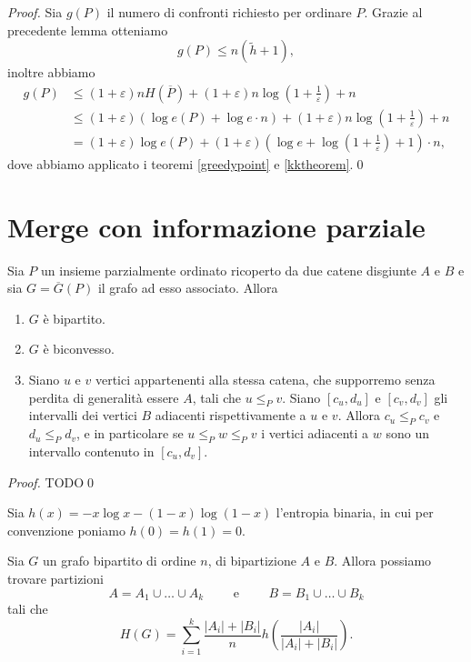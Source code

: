 \begin{proof}
	Sia \(g(P)\) il numero di confronti richiesto per ordinare \(P\). Grazie al precedente lemma otteniamo
	\[g(P)\le n(\tilde{h}+1),\]
	inoltre abbiamo 
	\begin{align}
		g(P)&\le (1+\varepsilon)nH(\overline{P})+(1+\varepsilon)n\log{\left(1+\frac{1}{\varepsilon}\right)}+n \nonumber \\
		&\le (1+\varepsilon)(\log{e(P)+\log{e\cdot n}})+(1+\varepsilon)n\log{\left(1+\frac{1}{\varepsilon}\right)}+n \nonumber \\
		&=(1+\varepsilon)\log{e(P)}+(1+\varepsilon)\left(\log{e}+\log{\left(1+\frac{1}{\varepsilon}\right)}+1\right)\cdot n, \nonumber 
	\end{align}
	dove abbiamo applicato i teoremi \ref{greedypoint} e \ref{kktheorem}.\qed 
\end{proof}

\section{Merge con informazione parziale}
\begin{lemma}
	\label{structurelemma} Sia \(P\) un insieme parzialmente ordinato ricoperto da due catene disgiunte \(A\) e \(B\) e sia \(G=\overline{G}(P)\) il grafo ad esso associato. Allora 
	\begin{enumerate}
		\item \(G\) è bipartito. 
		\item \(G\) è biconvesso. 
		\item Siano \(u\) e \(v\) vertici appartenenti alla stessa catena, che supporremo senza perdita di generalità essere \(A\), tali che \(u\le_{P} v\). Siano \([c_u,d_u]\) e \([c_v,d_v]\) gli intervalli dei vertici \(B\) adiacenti rispettivamente a \(u\) e \(v\). Allora \(c_u\le_{P} c_v\) e \(d_u\le_{P} d_v\), e in particolare se \(u\le_{P}w\le_{P}v\) i vertici adiacenti a \(w\) sono un intervallo contenuto in \([c_u,d_v]\). 
	\end{enumerate}
\end{lemma}
\begin{proof}
	TODO\qed 
\end{proof}
Sia \(h(x)=-x\log{x}-(1-x)\log{(1-x)}\) l'entropia binaria, in cui per convenzione poniamo \(h(0)=h(1)=0\).
\begin{theorem}
    Sia \(G\) un grafo bipartito di ordine \(n\), di bipartizione \(A\) e \(B\). Allora possiamo trovare partizioni
    \[A=A_1\cup\dots\cup A_k\qquad\text{ e }\qquad B=B_1\cup\dots\cup B_k\]
    tali che
    \[H(G)=\sum_{i=1}^k{\frac{|A_i|+|B_i|}{n}h\left(\frac{|A_i|}{|A_i|+|B_i|}\right)}.\]
\end{theorem}


